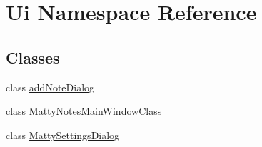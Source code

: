 \hypertarget{namespaceUi}{}\section{Ui Namespace Reference}
\label{namespaceUi}
\subsection*{Classes}
\begin{DoxyCompactItemize}
\item 
class \hyperlink{classUi_1_1addNoteDialog}{add\+Note\+Dialog}
\item 
class \hyperlink{classUi_1_1MattyNotesMainWindowClass}{Matty\+Notes\+Main\+Window\+Class}
\item 
class \hyperlink{classUi_1_1MattySettingsDialog}{Matty\+Settings\+Dialog}
\end{DoxyCompactItemize}
